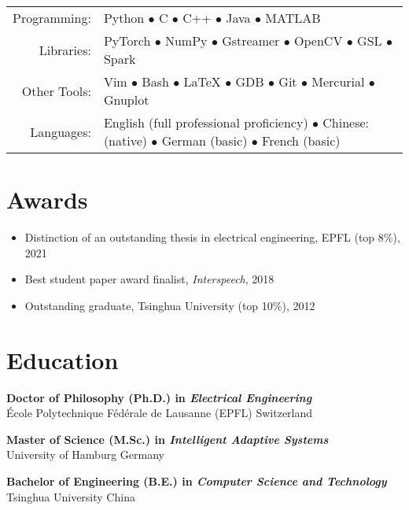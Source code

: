 \documentclass[a4paper,9pt]{extarticle} %
\newcommand{\ind}{\hspace*{1em}}
\begin{document}
\begin{tabular}{rl}
  Programming: & Python $\bullet$ C $\bullet$ C++ $\bullet$ Java $\bullet$ MATLAB \\
  Libraries: & PyTorch $\bullet$ NumPy $\bullet$ Gstreamer $\bullet$ OpenCV $\bullet$ GSL $\bullet$ Spark \\
  Other Tools: & Vim $\bullet$ Bash $\bullet$ \LaTeX{} $\bullet$ GDB $\bullet$ Git $\bullet$ Mercurial $\bullet$ Gnuplot \\
  Languages: & English (full professional proficiency) $\bullet$ Chinese: (native) $\bullet$ German (basic) $\bullet$ French (basic) \\
\end{tabular}


\section{Awards}

\begin{itemize}[itemsep=-.9em]
  \item Distinction of an outstanding thesis in electrical engineering, EPFL (top 8\%), 2021
  \item Best student paper award finalist, \textit{Interspeech}, 2018
  \item Outstanding graduate, Tsinghua University (top 10\%), 2012
\end{itemize}


\section{Education}
\parbox{\textwidth}{%
\textbf{Doctor of Philosophy (Ph.D.) in \textit{Electrical Engineering}} \\
\ind{} \'Ecole Polytechnique F\'ed\'erale de Lausanne (EPFL) \hfill Switzerland
}

\parbox{\textwidth}{%
\textbf{Master of Science (M.Sc.) in \textit{Intelligent Adaptive Systems}} \\
\ind{} University of Hamburg \hfill Germany
}

\parbox{\textwidth}{%
\textbf{Bachelor of Engineering (B.E.) in \textit{Computer Science and Technology}} \\
\ind{} Tsinghua University \hfill China
}
\end{document}
